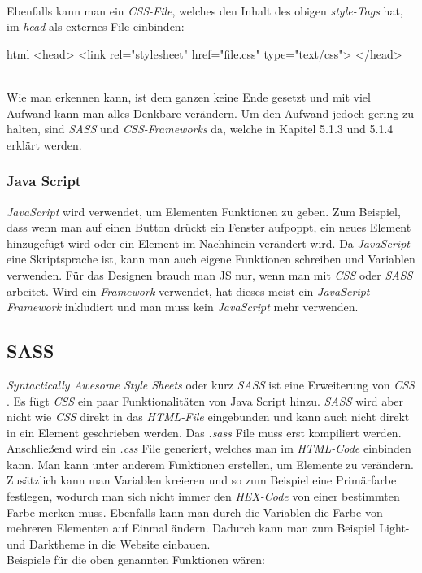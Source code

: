 	\label{list:cssbsp} ~\\
		Ebenfalls kann man ein \textit{CSS-File}, welches den Inhalt des obigen \textit{style-Tags} hat, im \textit{head} als externes File einbinden:
		\begin{code}{html}
			<head>
				<link rel="stylesheet" href="file.css" type="text/css">
			</head>
		\end{code}
	\label{list:csslink} ~\\
		Wie man erkennen kann, ist dem ganzen keine Ende gesetzt und mit viel Aufwand kann man alles Denkbare verändern. Um den Aufwand jedoch gering zu halten, sind \textit{SASS} und \textit{CSS-Frameworks} da, welche in Kapitel 5.1.3 und 5.1.4 erklärt werden.
		\subsubsection{Java Script}
		\textit{JavaScript} wird verwendet, um Elementen Funktionen zu geben. Zum Beispiel, dass wenn man auf einen Button drückt ein Fenster aufpoppt, ein neues Element hinzugefügt wird oder ein Element im Nachhinein verändert wird. Da \textit{JavaScript} eine Skriptsprache ist, kann man auch eigene Funktionen schreiben und Variablen verwenden. Für das Designen brauch man JS nur, wenn man mit \textit{CSS} oder \textit{SASS} arbeitet. Wird ein \textit{Framework} verwendet, hat dieses meist ein \textit{JavaScript-Framework} inkludiert und man muss kein \textit{JavaScript} mehr verwenden.
	\subsection{SASS}
	\textit{Syntactically Awesome Style Sheets} oder kurz \textit{SASS} ist eine Erweiterung von \textit{CSS} \cite{jump-start-sass}. Es fügt \textit{CSS} ein paar Funktionalitäten von Java Script hinzu. \textit{SASS} wird aber nicht wie \textit{CSS} direkt in das \textit{HTML-File} eingebunden und kann auch nicht direkt in ein Element geschrieben werden. Das \textit{.sass} File muss erst kompiliert werden. Anschließend wird ein \textit{.css} File generiert, welches man im \textit{HTML-Code} einbinden kann. Man kann unter anderem Funktionen erstellen, um Elemente zu verändern. Zusätzlich kann man Variablen kreieren und so zum Beispiel eine Primärfarbe festlegen, wodurch man sich nicht immer den \textit{HEX-Code} von einer bestimmten Farbe merken muss. Ebenfalls kann man durch die Variablen die Farbe von mehreren Elementen auf Einmal ändern. Dadurch kann man zum Beispiel Light- und Darktheme in die Website einbauen.\\Beispiele für die oben genannten Funktionen wären:

